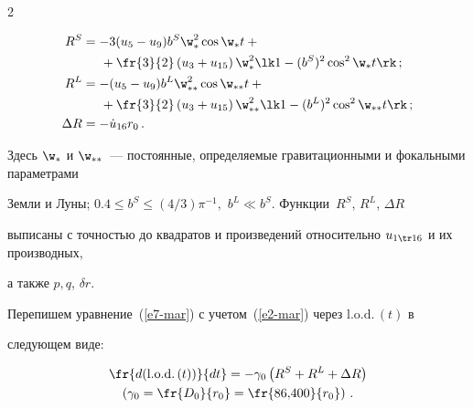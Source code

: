 \begin{multicols}{2}
\vspace*{-12pt}





\noindent


\begin{align*}


R^S &=-3 (u_5 - u_9) b^S \w_*^2 \cos \w_* t +{}\notag\\


&\hspace{5mm}{}+ \fr{3}{2} \left(u_3 + u_{15}\right) 


\w_*^2 \lk 1- (b^S)^2 \cos^2 \w_* t\rk\,; %


\\


R^L &=-(u_5-u_9) b^L \w_{**}^2 \cos \w_{**} t +{}\notag\\


&\hspace{5mm}{}+  \fr{3}{2} \left(u_3 + u_{15}\right) 


\w_{**}^2 \lk 1- (b^L)^2 \cos^2 \w_{**} t\rk\,; %


\\


\Delta R &=-\dot u_{16} r_0\,. %


\end{align*}


Здесь $\w_*$ и $\w_{**}$~--- постоянные, определяемые гравитационными и фокальными параметрами 


Земли и Луны;   $0.4\le b^S\le (4/3)\pi^{-1},$ $b^L \ll b^S$. Функции~$R^S$, $R^L$, $\Delta R$ 


выписаны с точностью до квадратов и произведений относительно $u_{1\tr 16}$ и их производных, 


а также $p,q$, $\delta r$.





Перепишем уравнение~(\ref{e7-mar}) с учетом~(\ref{e2-mar}) через $\mathrm{l.o.d.}\, (t)$ в 


следующем виде:


\begin{gather*}


\fr{d(\mathrm{l.o.d.}\, (t))}{dt} =-\gamma_0 \left(R^S + R^L +\Delta R\right) \\


\left( \gamma_0 = \fr{D_0}{r_0}=\fr{86{,}400}{r_0}\right)\,. %


\end{gather*}






\end{multicols}
